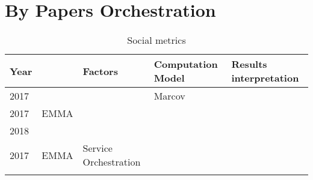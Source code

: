 \onecolumn
\section{By Papers Orchestration}
\setlength{\hoffset}{-.5in}


\begin{longtable}{lllll}
	Year  & \                                              & \textbf{Factors}           & \textbf{Computation Model}             & \textbf{Results interpretation}                               \\\hline
	2017  & \cite{yuzehuang_timeaware_2017}                &            			    & Marcov                                 & 											                      \\
	2017  & EMMA \cite{duhart_organic_2017}				   &     						&										 &																 \\\hline
	2018  & \cite{zarca_enhancing_2018}                    & 			                &                                        & 											                       \\\hline
	2017  & EMMA \cite{duhart_organic_2017}				   & Service Orchestration      &										 &																 \\\hline

	
\caption{Social metrics}
\end{longtable}

\clearpage
\newpage
\setlength{\hoffset}{-0in}
\twocolumn
